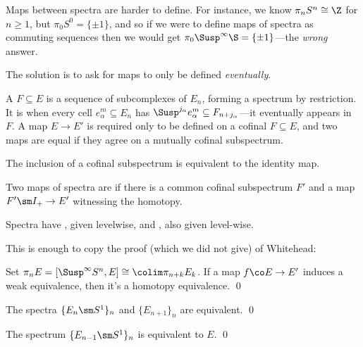 Maps between spectra are harder to define.  For instance, we know $\pi_n S^n \cong \Z$ for $n \ge 1$, but $\pi_0 S^0 = \{\pm 1\}$, and so if we were to define maps of spectra as commuting sequences then we would get $\pi_0 \Susp^\infty \S = \{\pm 1\}$---the \emph{wrong} answer.

The solution is to ask for maps to only be defined \emph{eventually}.

\begin{definition}
A  $F \subseteq E$ is a sequence of subcomplexes of $E_n$, forming a spectrum by restriction.  It is  when every cell $e^m_\alpha \subseteq E_n$ has $\Susp^{j_\alpha} e^m_\alpha \subseteq F_{n+j_\alpha}$---it eventually appears in $F$.  A map $E \to E'$ is required only to be defined on a cofinal $F \subseteq E$, and two maps are equal if they agree on a mutually cofinal subspectrum.
\end{definition}

\begin{remark}
The inclusion of a cofinal subspectrum is equivalent to the identity map.
\end{remark}

\begin{definition}
Two maps of spectra are  if there is a common cofinal subspectrum $F'$ and a map $F' \sm I_+ \to E'$ witnessing the homotopy.
\end{definition}

\begin{definition}
Spectra have , given levelwise, and , also given level-wise.
\end{definition}

This is enough to copy the proof (which we did not give) of Whitehead:

\begin{theorem}
Set $\pi_n E = [\Susp^\infty S^n, E] \cong \colim \pi_{n+k} E_k$.  If a map $f\co E \to E'$ induces a weak equivalence, then it's a homotopy equivalence. \qed
\end{theorem}

\begin{corollary}
The spectra $\{E_n \sm S^1\}_n$ and $\{E_{n+1}\}_n$ are equivalent. \qed
\end{corollary}

\begin{corollary}
The spectrum $\{E_{n-1} \sm S^1\}_n$ is equivalent to $E$. \qed
\end{corollary}

